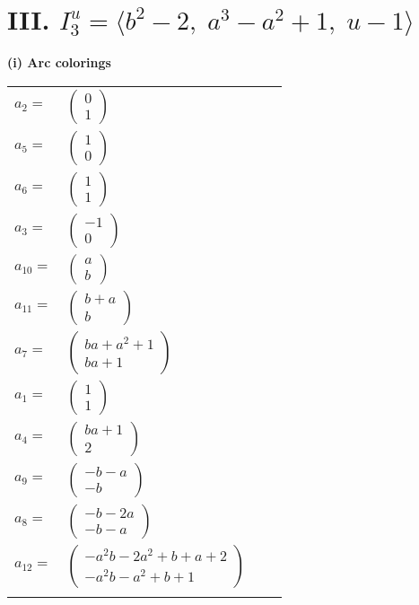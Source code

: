\documentclass[1p]{elsarticle_modified}
\theoremstyle{definition}
\begin{document}
\centering \section*{III. $I^u_{3}= \langle b^2-2,\;a^3- a^2+1,\;u-1 \rangle$}
\flushleft \textbf{(i) Arc colorings}\\
\begin{tabular}{m{7pt} m{180pt} m{7pt} m{180pt} }
\flushright $a_{2}=$&$\begin{pmatrix}0\\1\end{pmatrix}$ \\
\flushright $a_{5}=$&$\begin{pmatrix}1\\0\end{pmatrix}$ \\
\flushright $a_{6}=$&$\begin{pmatrix}1\\1\end{pmatrix}$ \\
\flushright $a_{3}=$&$\begin{pmatrix}-1\\0\end{pmatrix}$ \\
\flushright $a_{10}=$&$\begin{pmatrix}a\\b\end{pmatrix}$ \\
\flushright $a_{11}=$&$\begin{pmatrix}b+a\\b\end{pmatrix}$ \\
\flushright $a_{7}=$&$\begin{pmatrix}b a+a^2+1\\b a+1\end{pmatrix}$ \\
\flushright $a_{1}=$&$\begin{pmatrix}1\\1\end{pmatrix}$ \\
\flushright $a_{4}=$&$\begin{pmatrix}b a+1\\2\end{pmatrix}$ \\
\flushright $a_{9}=$&$\begin{pmatrix}- b- a\\- b\end{pmatrix}$ \\
\flushright $a_{8}=$&$\begin{pmatrix}- b-2 a\\- b- a\end{pmatrix}$ \\
\flushright $a_{12}=$&$\begin{pmatrix}- a^2 b-2 a^2+b+a+2\\- a^2 b- a^2+b+1\end{pmatrix}$\\&\end{tabular}
\end{document}
